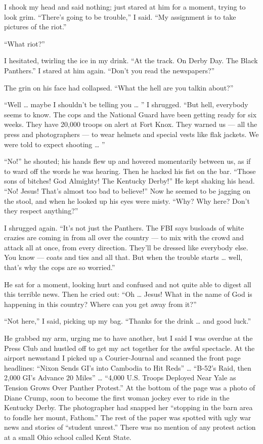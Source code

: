 \documentclass[10pt,a4paper]{article}
\begin{document}
I shook my head and said nothing; just stared at him for a moment, trying to look grim. “There’s going to be trouble,” I said. “My assignment is to take pictures of the riot.”

“What riot?”

I hesitated, twirling the ice in my drink. “At the track. On Derby Day. The Black Panthers.” I stared at him again. “Don’t you read the newspapers?”

The grin on his face had collapsed. “What the hell are you talkin about?”

“Well … maybe I shouldn’t be telling you … ” I shrugged. “But hell, everybody seems to know. The cops and the National Guard have been getting ready for six weeks. They have 20,000 troops on alert at Fort Knox. They warned us — all the press and photographers — to wear helmets and special vests like flak jackets. We were told to expect shooting … ”

“No!” he shouted; his hands flew up and hovered momentarily between us, as if to ward off the words he was hearing. Then he hacked his fist on the bar. “Those sons of bitches! God Almighty! The Kentucky Derby!” He kept shaking his head. “No! Jesus! That’s almost too bad to believe!” Now he seemed to be jagging on the stool, and when he looked up his eyes were misty. “Why? Why here? Don’t they respect anything?”

I shrugged again. “It’s not just the Panthers. The FBI says busloads of white crazies are coming in from all over the country — to mix with the crowd and attack all at once, from every direction. They’ll be dressed like everybody else. You know — coats and ties and all that. But when the trouble starts … well, that’s why the cops are so worried.”

He sat for a moment, looking hurt and confused and not quite able to digest all this terrible news. Then he cried out: “Oh … Jesus! What in the name of God is happening in this country? Where can you get away from it?”

“Not here,” I said, picking up my bag. “Thanks for the drink … and good luck.”

He grabbed my arm, urging me to have another, but I said I was overdue at the Press Club and hustled off to get my act together for the awful spectacle. At the airport newsstand I picked up a Courier-Journal and scanned the front page headlines: “Nixon Sends GI’s into Cambodia to Hit Reds” … “B-52’s Raid, then 2,000 GI’s Advance 20 Miles” … “4,000 U.S. Troops Deployed Near Yale as Tension Grows Over Panther Protest.” At the bottom of the page was a photo of Diane Crump, soon to become the first woman jockey ever to ride in the Kentucky Derby. The photographer had snapped her “stopping in the barn area to fondle her mount, Fathom.” The rest of the paper was spotted with ugly war news and stories of “student unrest.” There was no mention of any protest action at a small Ohio school called Kent State.
\end{document}

